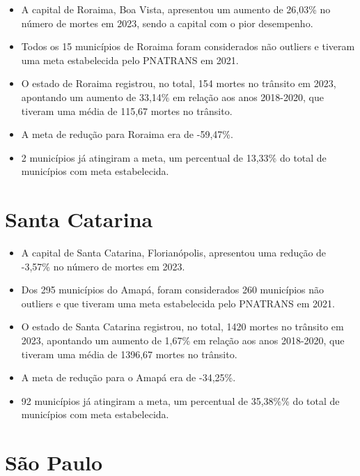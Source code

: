 \documentclass[
  letterpaper,
  DIV=11,
  numbers=noendperiod]{scrreprt}
\begin{document}
\begin{itemize}
\item
  A capital de Roraima, Boa Vista, apresentou um aumento de 26,03\% no
  número de mortes em 2023, sendo a capital com o pior desempenho.
\item
  Todos os 15 municípios de Roraima foram considerados não outliers e
  tiveram uma meta estabelecida pelo PNATRANS em 2021.
\item
  O estado de Roraima registrou, no total, 154 mortes no trânsito em
  2023, apontando um aumento de 33,14\% em relação aos anos 2018-2020,
  que tiveram uma média de 115,67 mortes no trânsito.
\item
  A meta de redução para Roraima era de -59,47\%.
\item
  2 municípios já atingiram a meta, um percentual de 13,33\% do total de
  municípios com meta estabelecida.
\end{itemize}

\section{Santa Catarina}\label{santa-catarina}

\begin{itemize}
\item
  A capital de Santa Catarina, Florianópolis, apresentou uma redução de
  -3,57\% no número de mortes em 2023.
\item
  Dos 295 municípios do Amapá, foram considerados 260 municípios não
  outliers e que tiveram uma meta estabelecida pelo PNATRANS em 2021.
\item
  O estado de Santa Catarina registrou, no total, 1420 mortes no
  trânsito em 2023, apontando um aumento de 1,67\% em relação aos anos
  2018-2020, que tiveram uma média de 1396,67 mortes no trânsito.
\item
  A meta de redução para o Amapá era de -34,25\%.
\item
  92 municípios já atingiram a meta, um percentual de 35,38\%\% do total
  de municípios com meta estabelecida.
\end{itemize}

\section{São Paulo}\label{suxe3o-paulo}
\end{document}
